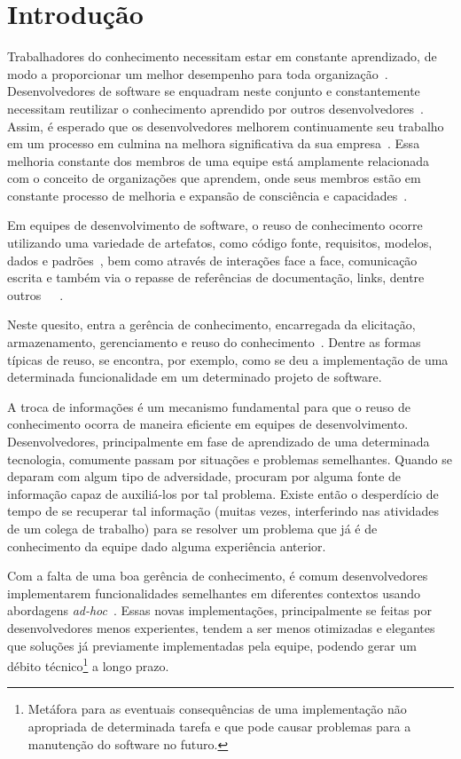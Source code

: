 \chapter{Introdução}

Trabalhadores do conhecimento necessitam estar em constante aprendizado, de modo a proporcionar um melhor desempenho para toda organização~\cite{Druker1993}. Desenvolvedores de software se enquadram neste conjunto e constantemente necessitam reutilizar o conhecimento aprendido por outros desenvolvedores~\cite{Wiig2003}.
Assim, é esperado que os desenvolvedores melhorem continuamente seu trabalho em um processo em culmina na melhora significativa da sua empresa~\cite{Kavitha2011}. Essa melhoria constante dos membros de uma equipe está amplamente relacionada com o conceito de organizações que aprendem, onde seus membros estão em constante processo de melhoria e expansão de consciência e capacidades~\cite{Senge2014}.

Em equipes de desenvolvimento de software, o reuso de conhecimento ocorre utilizando uma variedade de artefatos, como código fonte, requisitos, modelos, dados e padrões~\cite{Levy2009}, bem como através de interações face a face, comunicação escrita e também via o repasse de referências de documentação, links, dentre outros~\cite{Storey2014}~\cite{Olson2000}~\cite{CubraniC2004}.

Neste quesito, entra a gerência de conhecimento, encarregada da elicitação, armazenamento, gerenciamento e reuso do conhecimento~\cite{Levy2009}.
Dentre as formas típicas de reuso, se encontra, por exemplo, como se deu a implementação de uma determinada funcionalidade em um determinado projeto de software.

A troca de informações é um mecanismo fundamental para que o reuso de conhecimento ocorra de maneira eficiente em equipes de desenvolvimento. Desenvolvedores, principalmente em fase de aprendizado de uma determinada tecnologia, comumente passam por situações e problemas semelhantes. Quando se deparam com algum tipo de adversidade, procuram por alguma fonte de informação capaz de auxiliá-los por tal problema. Existe então o desperdício de tempo de se recuperar tal informação (muitas vezes, interferindo nas atividades de um colega de trabalho) para se resolver um problema que já é de conhecimento da equipe dado alguma experiência anterior.

Com a falta de uma boa gerência de conhecimento, é comum desenvolvedores implementarem funcionalidades semelhantes em diferentes contextos usando abordagens \textit{ad-hoc}~\cite{SangMok2011}. Essas novas implementações, principalmente se feitas por desenvolvedores menos experientes, tendem a ser menos otimizadas e elegantes que soluções já previamente implementadas pela equipe, podendo gerar um débito técnico\footnote{Metáfora para as eventuais consequências de uma implementação não apropriada de determinada tarefa e que pode causar problemas para a manutenção do software no futuro.} a longo prazo.

